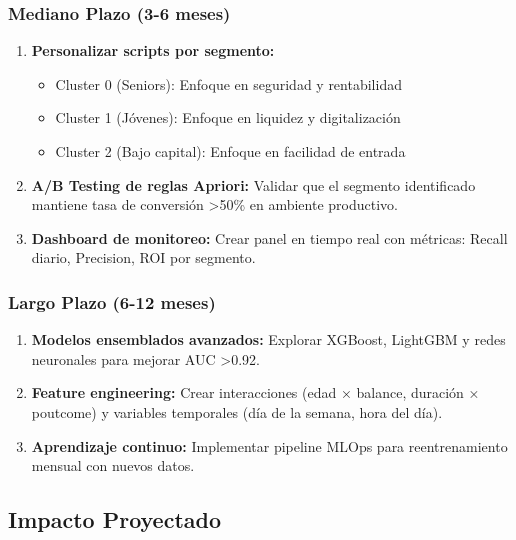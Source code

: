 \documentclass[12pt,letterpaper]{article}
\begin{document}
\subsubsection{Mediano Plazo (3-6 meses)}

\begin{enumerate}
    \item \textbf{Personalizar scripts por segmento:}
    \begin{itemize}
        \item Cluster 0 (Seniors): Enfoque en seguridad y rentabilidad
        \item Cluster 1 (Jóvenes): Enfoque en liquidez y digitalización
        \item Cluster 2 (Bajo capital): Enfoque en facilidad de entrada
    \end{itemize}
    
    \item \textbf{A/B Testing de reglas Apriori:} Validar que el segmento identificado mantiene tasa de conversión >50\% en ambiente productivo.
    
    \item \textbf{Dashboard de monitoreo:} Crear panel en tiempo real con métricas: Recall diario, Precision, ROI por segmento.
\end{enumerate}

\subsubsection{Largo Plazo (6-12 meses)}

\begin{enumerate}
    \item \textbf{Modelos ensemblados avanzados:} Explorar XGBoost, LightGBM y redes neuronales para mejorar AUC >0.92.
    
    \item \textbf{Feature engineering:} Crear interacciones (edad × balance, duración × poutcome) y variables temporales (día de la semana, hora del día).
    
    \item \textbf{Aprendizaje continuo:} Implementar pipeline MLOps para reentrenamiento mensual con nuevos datos.
\end{enumerate}

\subsection{Impacto Proyectado}
\end{document}
